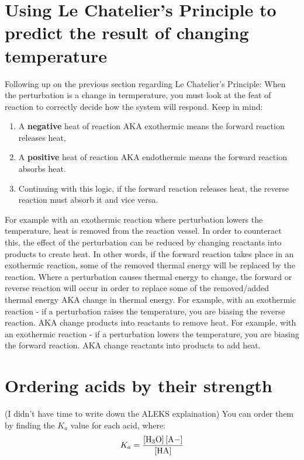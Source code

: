 \documentclass{article}  %
\begin{document}
\section*{Using Le Chatelier's Principle to predict the result of changing temperature}
Following up on the previous section regarding Le Chatelier's Principle: 
\newline
When the perturbation is a change in termperature, you must look at the feat of reaction to correctly decide how the system will respond. Keep in mind:
\begin{enumerate}
     \item A \textbf{negative} heat of reaction AKA exothermic means the forward reaction releases heat, 
     \item A \textbf{positive} heat of reaction AKA endothermic means the forward reaction absorbs heat.
     \item Continuing with this logic, if the forward reaction releases heat, the reverse reaction must absorb it and vice versa.
\end{enumerate}
For example with an exothermic reaction where perturbation lowers the temperature, heat is removed from the reaction vessel. In order to counteract this, the effect of the perturbation can be reduced by changing reactants into products to create heat. In other words, if the forward reaction takes place in an exothermic reaction, some of the removed thermal energy will be replaced by the reaction. 
\newline
Where a perturbation causes thermal energy to change, the forward or reverse reaction will occur in order to replace some of the removed/added thermal energy AKA change in thermal energy.
\newline
For example, with an exothermic reaction - if a perturbation raises the temperature, you are biasing the reverse reaction. AKA change products into reactants to remove heat.
\newline
For example, with an exothermic reaction - if a perturbation lowers the temperature, you are biasing the forward reaction. AKA change reactants into products to add heat.

\section*{Ordering acids by their strength}
(I didn't have time to write down the ALEKS explaination) You can order them by finding the $K_a$ value for each acid, where:
\begin{equation*}
    \begin{aligned}
        K_a = \ce{\frac{[H3O] [A-]}{[HA]}}
    \end{aligned}
\end{equation*}
\end{document}
